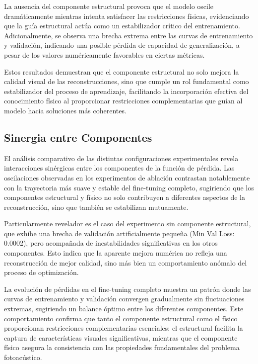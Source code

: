 La ausencia del componente estructural provoca que el modelo oscile dramáticamente mientras intenta satisfacer las restricciones físicas, evidenciando que la guía estructural actúa como un estabilizador crítico del entrenamiento. Adicionalmente, se observa una brecha extrema entre las curvas de entrenamiento y validación, indicando una posible pérdida de capacidad de generalización, a pesar de los valores numéricamente favorables en ciertas métricas.

Estos resultados demuestran que el componente estructural no solo mejora la calidad visual de las reconstrucciones, sino que cumple un rol fundamental como estabilizador del proceso de aprendizaje, facilitando la incorporación efectiva del conocimiento físico al proporcionar restricciones complementarias que guían al modelo hacia soluciones más coherentes.

\subsection{Sinergia entre Componentes}

El análisis comparativo de las distintas configuraciones experimentales revela interacciones sinérgicas entre los componentes de la función de pérdida. Las oscilaciones observadas en los experimentos de ablación contrastan notablemente con la trayectoria más suave y estable del fine-tuning completo, sugiriendo que los componentes estructural y físico no solo contribuyen a diferentes aspectos de la reconstrucción, sino que también se estabilizan mutuamente.

Particularmente revelador es el caso del experimento sin componente estructural, que exhibe una brecha de validación artificialmente pequeña (Min Val Loss: 0.0002), pero acompañada de inestabilidades significativas en los otros componentes. Esto indica que la aparente mejora numérica no refleja una reconstrucción de mejor calidad, sino más bien un comportamiento anómalo del proceso de optimización.

La evolución de pérdidas en el fine-tuning completo muestra un patrón donde las curvas de entrenamiento y validación convergen gradualmente sin fluctuaciones extremas, sugiriendo un balance óptimo entre los diferentes componentes. Este comportamiento confirma que tanto el componente estructural como el físico proporcionan restricciones complementarias esenciales: el estructural facilita la captura de características visuales significativas, mientras que el componente físico asegura la consistencia con las propiedades fundamentales del problema fotoacústico.


